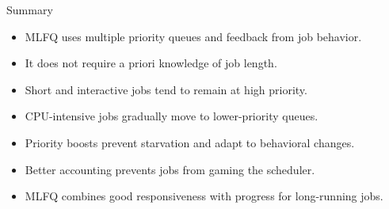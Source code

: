 \begin{frame}{Summary}
    \begin{itemize}
        \item MLFQ uses multiple priority queues and feedback from job behavior.
        \item It does not require a priori knowledge of job length.
        \item Short and interactive jobs tend to remain at high priority.
        \item CPU-intensive jobs gradually move to lower-priority queues.
        \item Priority boosts prevent starvation and adapt to behavioral changes.
        \item Better accounting prevents jobs from gaming the scheduler.
        \item MLFQ combines good responsiveness with progress for long-running jobs.
    \end{itemize}
\end{frame}

